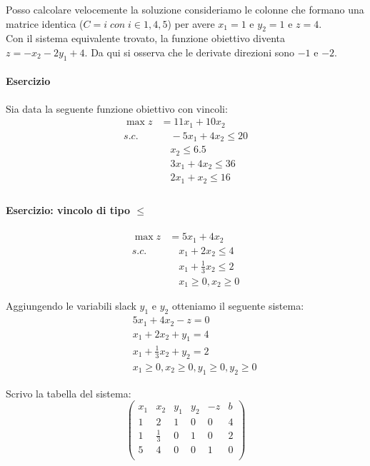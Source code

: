 \documentclass{article}
\begin{document}
Posso calcolare velocemente la soluzione consideriamo le colonne che formano una 
matrice identica ($C=i\; con\; i \in {1,4,5}$) per avere $x_1=1$ e $y_2=1$ e $z=4$.\\

Con il sistema equivalente trovato, la funzione obiettivo diventa $z=-x_2-2y_1+4$.
Da qui si osserva che le derivate direzioni sono $-1$ e $-2$.

\paragraph{Esercizio}
Sia data la seguente funzione obiettivo con vincoli:
\begin{align*}
  \max z &= 11x_1 + 10x_2 \\ 
  s.c. &\quad -5x_1 + 4x_2 \leq 20\\ 
  &\quad x_2 \leq 6.5\\ 
  &\quad 3x_1 + 4x_2 \leq 36\\ 
  &\quad 2x_1 + x_2 \leq 16\\ 
\end{align*}

\paragraph{Esercizio: vincolo di tipo $\leq$}
\begin{align*}
  \max z &= 5x_1 + 4x_2 \\ 
  s.c. &\quad x_1 + 2x_2 \leq 4\\ 
       &\quad x_1 + \frac{1}{3}x_2 \leq 2 \\ 
       &\quad x_1 \geq 0, x_2 \geq 0
\end{align*}

Aggiungendo le variabili slack $y_1$ e $y_2$ otteniamo il seguente sistema:
\begin{align*}
  &\quad 5x_1 + 4x_2 - z = 0\\ 
  &\quad x_1 + 2x_2 + y_1 = 4\\ 
  &\quad x_1 + \frac{1}{3}x_2 + y_2 = 2\\ 
  &\quad x_1 \geq 0, x_2 \geq 0, y_1 \geq 0, y_2 \geq 0
\end{align*}

Scrivo la tabella del sistema: 
\begin{equation*}
  \begin{pmatrix}
    x_1 & x_2 & y_1 & y_2 & -z & b\\
    1 & 2 & 1 & 0 & 0 & 4\\ 
    1 & \frac{1}{3} & 0 & 1 & 0 & 2\\ 
    5 & 4 & 0 & 0 & 1 & 0\\ 
  \end{pmatrix}
\end{equation*}
\end{document}
